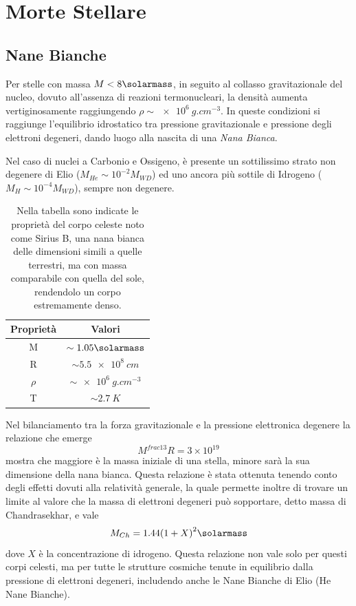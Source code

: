 \section{Morte Stellare}\label{sec:morte-stellare}
\subsection{Nane Bianche}\label{sec:nane-bianche}
Per stelle con massa $M < 8\si{\solarmass}$, in seguito al collasso gravitazionale del nucleo, dovuto all'assenza di reazioni termonucleari, la densità aumenta vertiginosamente raggiungendo $\rho \sim \SI{e6}{g.cm^{-3}}$. In queste condizioni si raggiunge l'equilibrio idrostatico tra pressione gravitazionale e pressione degli elettroni degeneri, dando luogo alla nascita di una \textit{Nana Bianca}.

Nel caso di nuclei a Carbonio e Ossigeno, è presente un sottilissimo strato non degenere di Elio ($M_{He} \sim 10^{-2} M_{WD}$) ed uno ancora più sottile di Idrogeno ($M_{H} \sim 10^{-4} M_{WD}$), sempre non degenere. 

\begin{table}
    \centering
    \caption{Nella tabella sono indicate le proprietà del corpo celeste noto come Sirius B, una nana bianca delle dimensioni simili a quelle terrestri, ma con massa comparabile con quella del sole, rendendolo un corpo estremamente denso.}\label{tab:sirius-b}
    \begin{tabular}{c|c}
        \toprule
        Proprietà & Valori\\
        \midrule
        M & $\sim 1.05 \si{\solarmass}$\\
        R & $\sim \SI{5.5 e8}{cm}$\\
        $\rho$ & $\sim \SI{e6}{g.cm^{-3}}$\\
        T & $\sim \SI{2.7}{K}$\\
        \bottomrule
    \end{tabular}
\end{table}

Nel bilanciamento tra la forza gravitazionale e la pressione elettronica degenere la relazione che emerge
\[
    M^{frac{1}{3}}R = 3\times 10^{19}
\]
mostra che maggiore è la massa iniziale di una stella, minore sarà la sua dimensione della nana bianca. Questa relazione è stata ottenuta tenendo conto degli effetti dovuti alla relatività generale, la quale permette inoltre di trovare un limite al valore che la massa di elettroni degeneri può sopportare, detto massa di Chandrasekhar, e vale
\[
    M_{Ch} = 1.44{(1+X)}^2 \si{\solarmass}
\]
dove $X$ è la concentrazione di idrogeno.
Questa relazione non vale solo per questi corpi celesti, ma per tutte le strutture cosmiche tenute in equilibrio dalla pressione di elettroni degeneri, includendo anche le Nane Bianche di Elio (He Nane Bianche).

